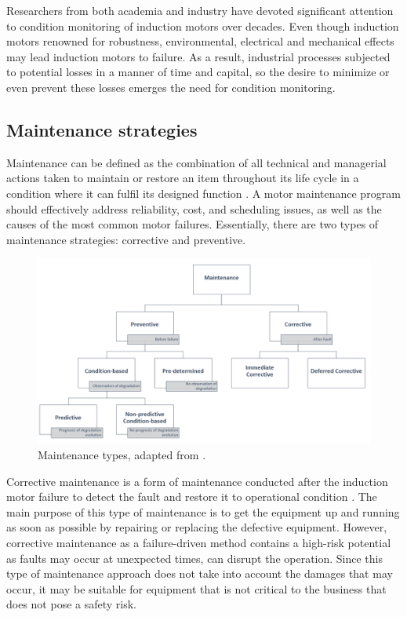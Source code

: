 Researchers from both academia and industry have devoted significant attention to condition monitoring of induction motors over decades. Even though induction motors renowned for robustness, environmental, electrical and mechanical effects may lead induction motors to failure. As a result, industrial processes subjected to potential losses in a manner of time and capital, so the desire to minimize or even prevent these losses emerges the need for condition monitoring. 
\pagebreak
\subsection{Maintenance strategies}

Maintenance can be defined as the combination of all technical and managerial actions taken to maintain or restore an item throughout its life cycle in a condition where it can fulfil its designed function \cite{en201713306}. A motor maintenance program should effectively address reliability, cost, and scheduling issues, as well as the causes of the most common motor failures. Essentially, there are two types of maintenance strategies: corrective and preventive. 

\begin{figure}[h]
	\centering
	\includegraphics[width=400pt,keepaspectratio=true]{./fig/maintenance.PNG}
	\caption{Maintenance types, adapted from \cite{en201713306}.}	
	\label{maintenance}
\end{figure}

Corrective maintenance is a form of maintenance conducted after the induction motor failure to detect the fault and restore it to operational condition \cite{en201713306}. The main purpose of this type of maintenance is to get the equipment up and running as soon as possible by repairing or replacing the defective equipment. However, corrective maintenance as a failure-driven method contains a high-risk potential as faults may occur at unexpected times, can disrupt the operation. Since this type of maintenance approach does not take into account the damages that may occur, it may be suitable for equipment that is not critical to the business that does not pose a safety risk.

